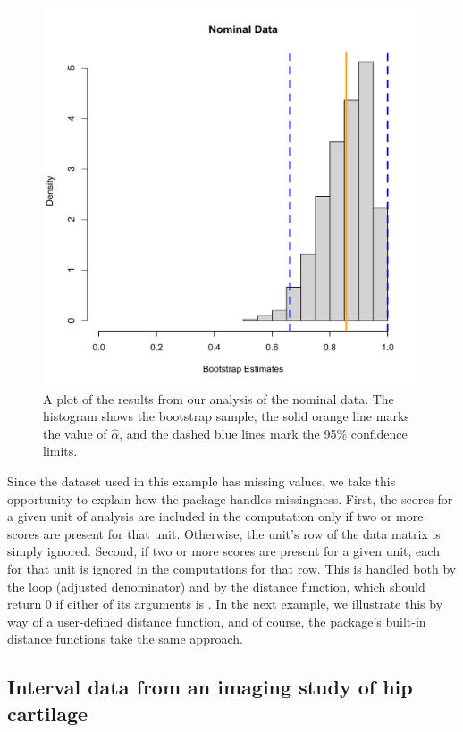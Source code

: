 \begin{figure}[ht]
   \centering
   \includegraphics[scale=.6]{nominal}
   \caption{A plot of the results from our analysis of the nominal data. The histogram shows the bootstrap sample, the solid orange line marks the value of $\hat{\alpha}$, and the dashed blue lines mark the 95\% confidence limits.}
   \label{fig:nominal}
\end{figure}

Since the dataset used in this example has missing values, we take this opportunity to explain how the package handles missingness. First, the scores for a given unit of analysis are included in the computation only if two or more scores are present for that unit. Otherwise, the unit's row of the data matrix is simply ignored. Second, if two or more scores are present for a given unit, each  for that unit is ignored in the computations for that row. This is handled both by the loop (adjusted denominator) and by the distance function, which should return 0 if either of its arguments is . In the next example, we illustrate this by way of a user-defined distance function, and of course, the package's built-in distance functions take the same approach.

\subsection{Interval data from an imaging study of hip cartilage}

